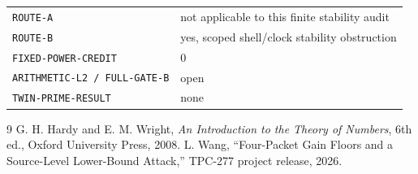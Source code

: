 \documentclass[11pt]{article}
\begin{document}
\begin{center}
\begin{tabular}{ll}
\texttt{ROUTE-A} & not applicable to this finite stability audit\\
\texttt{ROUTE-B} & yes, scoped shell/clock stability obstruction\\
\texttt{FIXED-POWER-CREDIT} & 0\\
\texttt{ARITHMETIC-L2 / FULL-GATE-B} & open\\
\texttt{TWIN-PRIME-RESULT} & none
\end{tabular}
\end{center}

\begin{thebibliography}{9}
 G. H. Hardy and E. M. Wright, \emph{An Introduction to the
Theory of Numbers}, 6th ed., Oxford University Press, 2008.
 L. Wang, ``Four-Packet Gain Floors and a Source-Level
Lower-Bound Attack,'' TPC-277 project release, 2026.
\end{thebibliography}
\end{document}
